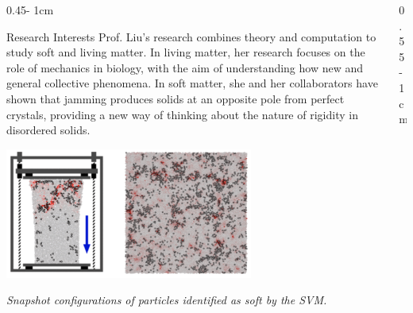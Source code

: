 \documentclass{../psuposter}
\begin{document}
\begin{frame}
\begin{columns}[t, totalwidth=\textwidth]
\begin{column}{0.45\textwidth - 1cm}
    \begin{block}{Research Interests}
        Prof. Liu’s research combines theory and computation to study soft and living matter. 
        In living matter, her research focuses on the role of mechanics in biology, with the aim of understanding how new and general collective phenomena. %
        In soft matter, she and her collaborators have shown that jamming produces solids at an opposite pole from perfect crystals, providing a new way of thinking about the nature of rigidity in disordered solids. 
        \begin{center}
	    	\includegraphics[width=0.65\textwidth]{images/research}    		


    	\textit{Snapshot configurations of particles identified as soft by the SVM. \cite{cubukIdentifyingStructuralFlow2015}} 
    	\end{center}

    	
    \end{block}
\end{column}
\begin{column}{0.55\textwidth - 1cm}



\end{column}
\end{columns}
\end{frame}
\end{document}

